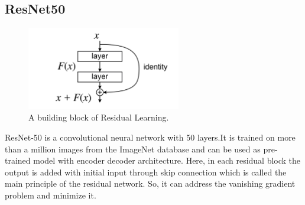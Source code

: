 \documentclass[a4paper,12pt,oneside]{book}
\begin{document}
\subsection{ResNet50}
\begin{figure}[!hbtp]
\centering
\includegraphics[width=0.6\textwidth]{Figures/ResBlock.png}
\captionsetup{font=small}
\caption{A building block of Residual Learning.}
\label{fig:resnet}
\end{figure}
ResNet-50 is a convolutional neural network with 50 layers.It is trained on more than a million images from the ImageNet database and can be used as pre-trained model with encoder decoder architecture. Here, in each residual block
the output is added with initial input through skip connection which is called the main principle of the residual network. So, it can address the vanishing gradient problem and minimize it.
\end{document}
